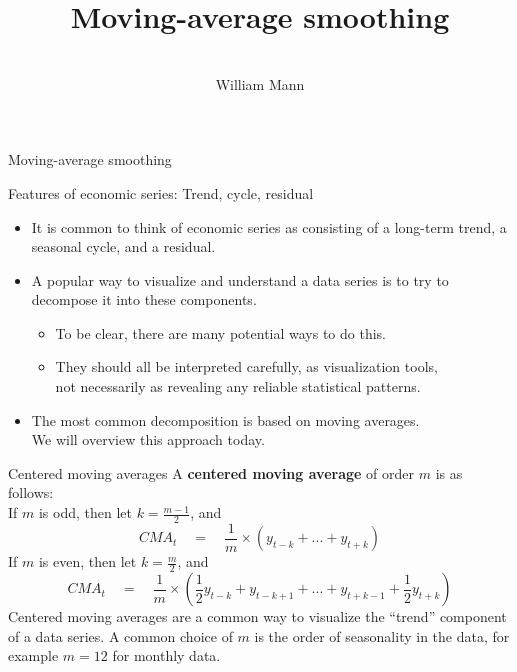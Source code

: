 \documentclass[t,12pt]{beamer}
\begin{document}
\title[Moving-average smoothing]{Moving-average smoothing}
\author{\vspace{0.35in} \\ {\selectfont William Mann} \vspace{-0.35in}}

\date{}
\maketitle

	\begin{frame}[c]
	\vfill
	\centerline{Moving-average smoothing}
	\vfill
	\end{frame}

	\begin{frame}[c]{Features of economic series: Trend, cycle, residual}
	\begin{itemize}
	\item
	It is common to think of economic series as consisting of a long-term trend, a seasonal cycle, and a residual.
	\medskip
	\item
	A popular way to visualize and understand a data series is to try to decompose it into these components.
	\begin{itemize}
	\smallskip
	\item
	To be clear, there are many potential ways to do this. 
	\item
	They should all be interpreted carefully, as visualization tools, 
	\\ not necessarily as revealing any reliable statistical patterns.
	\end{itemize}
	\medskip
	\item
	The most common decomposition is based on moving averages.
	\\ We will overview this approach today.
	\end{itemize}
	\end{frame}

	\begin{frame}[c]{Centered moving averages}
	A \textbf{centered moving average} of order $m$ is as follows:
	\\ \medskip
	If $m$ is odd, then let $k = \frac{m-1}{2}$, and
	$$
	CMA_t \quad = \quad \frac{1}{m} \times (y_{t-k} + ... + y_{t+k})
	$$
	If $m$ is even, then let $k = \frac{m}{2}$, and
	$$
	CMA_t \quad = \quad \frac{1}{m} \times \left( \frac{1}{2} y_{t-k} + y_{t-k+1} + ... + y_{t+k-1} + \frac{1}{2} y_{t+k} \right)
	$$
	Centered moving averages are a common way to visualize the ``trend'' component of a data series.
	A common choice of $m$ is the order of seasonality in the data, for example $m=12$ for monthly data.
	\end{frame}
\end{document}

